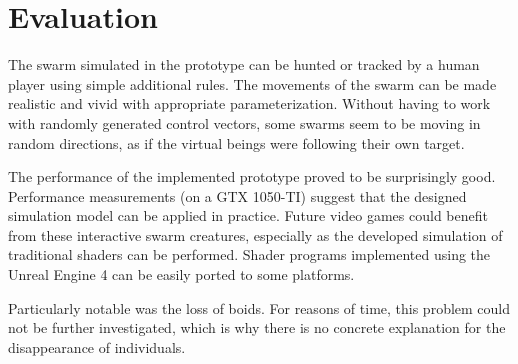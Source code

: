 \documentclass[a4paper, 10pt, journal]{wissarbIEEE}      %
\begin{document}
\section{Evaluation}





The swarm simulated in the prototype can be hunted or tracked by a human player using simple additional rules. The movements of the swarm can be made realistic and vivid with appropriate parameterization. Without having to work with randomly generated control vectors, some swarms seem to be moving in random directions, as if the virtual beings were following their own target. 

The performance of the implemented prototype proved to be surprisingly good. Performance measurements (on a GTX 1050-TI) suggest that the designed simulation model can be applied in practice. Future video games could benefit from these interactive swarm creatures, especially as the developed simulation of traditional shaders can be performed. Shader programs implemented using the Unreal Engine 4 can be easily ported to some platforms. 

Particularly notable was the loss of boids. For reasons of time, this problem could not be further investigated, which is why there is no concrete explanation for the disappearance of individuals.
\end{document}
